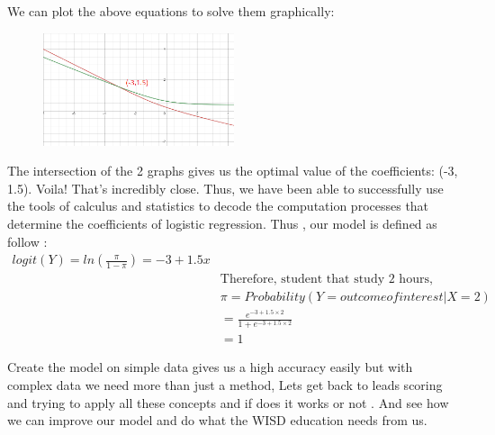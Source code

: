 We can plot the above equations to solve them graphically:
\begin{figure}[ht]
    \centering
    \includegraphics[width=0.5\textwidth]{assets/graph1.png}
\end{figure}
The intersection of the 2 graphs gives us the optimal value of the coefficients: (-3, 1.5). Voila! That’s incredibly close. Thus, we have been able to successfully use the tools of calculus and statistics to decode the computation processes that determine the coefficients of logistic regression.
Thus , our model is defined as follow :
\begin{align*}
    logit(Y) = ln\left(\frac{\pi}{1-\pi}\right) = -3 + 1.5 x\\
    &\text{Therefore, student that study 2 hours,}\\
    &\pi = Probability ( Y = outcome of interest | X=2 )\\  
    &= { \frac{e^{-3 + 1.5\times 2 }}{ {1+e^{-3 + 1.5\times 2 }}} }\\
    &= 1
\end{align*}

Create the model on simple data gives us a high accuracy easily but with complex data we need more than just a method, Lets get back to leads scoring and trying to apply all these concepts and if does it works or not . And see how we can improve our model and do what the WISD education needs from us.

